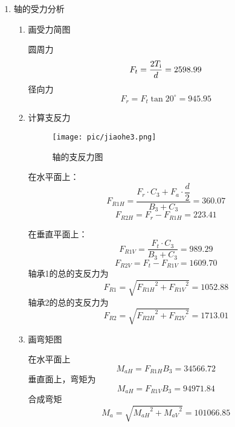 \begin{enumerate}[A]
	\item 轴的受力分析
	\begin{enumerate}[a]
		\item 画受力简图
		\par 圆周力 $$F_t=\frac{2T_{\mathrm{{\uppercase\expandafter{\romannumeral1}}}}}{d}=2598.99$$
		径向力 $$F_r=F_t\tan{20^{\circ}}=945.95$$
		\item 计算支反力 
		\begin{figure}[H]
			\begin{center}
				\caption{轴\uppercase\expandafter{}的支反力图}
				\texttt{[image: pic/jiaohe3.png]}
			\end{center}
		\end{figure}
		\par 在水平面上：
		$$F_{R1H}=\dfrac{F_r\cdot C_3+F_a\cdot \dfrac{d}{2}}{B_3+C_3}=360.07$$
		$$F_{R2H}=F_r-F_{R1H}=223.41$$
		\par 在垂直平面上：
		$$F_{R1V}=\dfrac{F_t\cdot C_3}{B_3+C_3}=989.29$$
		$$F_{R2V}=F_t-F_{R1V}=1609.70$$
		轴承1的总的支反力为
		$$F_{R1}=\sqrt{{F_{R1H}}^2+{F_{R1V}}^2}=1052.88$$
		轴承2的总的支反力为
		$$F_{R2}=\sqrt{{F_{R2H}}^2+{F_{R2V}}^2}=1713.01$$
		\item 画弯矩图
		\par 在水平面上 
		$$M_{aH}=F_{R1H}B_3=34566.72$$
		垂直面上，弯矩为\\
		$$M_{aH}=F_{R1V}B_3=94971.84$$
		合成弯矩
		$$M_a=\sqrt{{M_{aH}}^2+{M_{aV}}^2}=101066.85$$
		

\end{enumerate}
\end{enumerate}
